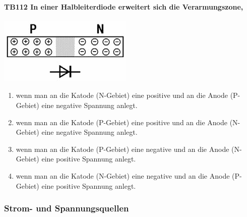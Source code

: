 \documentclass[8pt]{article}
\begin{document}
\begin{enumerate}
\paragraph*{TB112 In einer Halbleiterdiode erweitert sich die Verarmungszone,}
\begin{center}
	\begin{minipage}{\linewidth}
		\centering
		\includegraphics[scale=0.7]{pics/tb112_a.jpg}
	\end{minipage}
\end{center}
\begin{enumerate}[nolistsep,label=\Alph*]
\item wenn man an die Katode (N-Gebiet) eine positive und an die Anode (P-Gebiet) eine negative Spannung anlegt.
\item wenn man an die Katode (P-Gebiet) eine positive und an die Anode (N-Gebiet) eine negative Spannung anlegt.
\item wenn man an die Katode (P-Gebiet) eine negative und an die Anode (N-Gebiet) eine positive Spannung anlegt.
\item wenn man an die Katode (N-Gebiet) eine negative und an die Anode (P-Gebiet) eine positive Spannung anlegt.
\end{enumerate}


\pagebreak
\subsubsection{Strom- und Spannungsquellen}


\end{enumerate}
\end{document}
